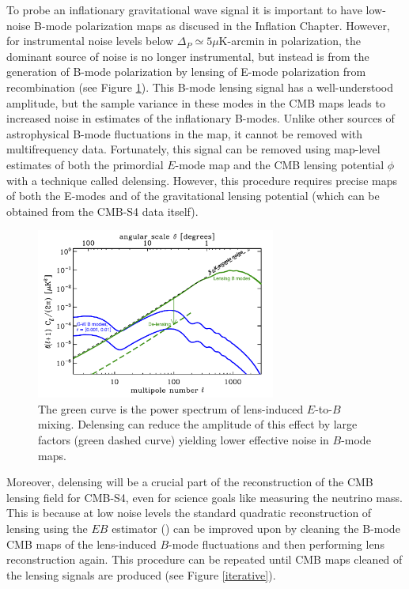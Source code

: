 To probe an inflationary gravitational wave signal it is important to have low-noise B-mode polarization maps as discused in the Inflation Chapter. However, for instrumental noise levels below $\Delta_P \simeq 5 \mu$K-arcmin in polarization, the dominant source of noise is no longer instrumental, but instead is from the generation of B-mode polarization by lensing of E-mode polarization from recombination (see Figure \ref{snowmssDelens}).  This B-mode lensing signal has a well-understood amplitude, but the sample variance in these modes in the CMB maps leads to increased noise in estimates of the inflationary B-modes. Unlike other sources of astrophysical B-mode fluctuations in the map, it cannot be removed with multifrequency data.  Fortunately, this signal can be removed using map-level estimates of both the primordial $E$-mode map and the CMB lensing potential $\phi$ with a technique called delensing. However, this procedure requires
precise maps of both the E-modes and of the gravitational lensing potential
(which can be obtained from the CMB-S4 data itself).

\begin{figure}[htbp]
\centering
\includegraphics[width=0.7\textwidth]{CMBLensing/cmb_powspec_for_s4scibooklensing.pdf}
\caption{The green curve is the power spectrum of lens-induced $E$-to-$B$ mixing.  Delensing can reduce the amplitude of this effect by large factors (green dashed curve) yielding lower effective noise in $B$-mode maps.}
\label{snowmssDelens}
\end{figure}


Moreover, delensing will be a crucial part of the reconstruction of the CMB lensing field for CMB-S4, even for science goals like measuring the neutrino mass.  This is because at low noise levels the standard quadratic reconstruction of lensing using the $EB$ estimator (\cite{Hu:2001kj}) can be improved upon by cleaning the B-mode CMB maps of the lens-induced $B$-mode fluctuations and then performing lens reconstruction again.  This procedure can be repeated until CMB maps cleaned of the lensing signals are produced (see Figure \ref{iterative}).  

